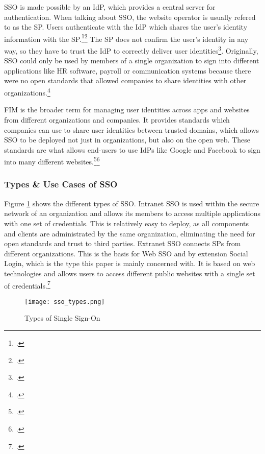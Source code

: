 \ac{SSO} is made possible by an \ac{IdP}, which provides a central server for authentication.
When talking about \ac{SSO}, the website operator is usually refered to as the \ac{SP}.
Users authenticate with the \ac{IdP} which shares the user's identity information with the \ac{SP}.\footcite[Cp.][p. 24]{Beltran2016}\footcite[Cp.][p. 25]{Bauer2013}
The \ac{SP} does not confirm the user's identity in any way, so they have to trust the \ac{IdP} to correctly
deliver user identities\footcite[Cp.][]{Nallathamby2018}.
Originally, \ac{SSO} could only be used by members of a single organization to sign into different 
applications like HR software, payroll or communication systems because there were no open standards
that allowed companies to share identities with other organizations.\footcite[Cp.][]{OktaFIM}

\ac{FIM} is the broader term for managing user identities across apps and websites from different organizations and companies.
It provides standards which companies can use to share user identities between trusted domains,
which allows \ac{SSO} to be deployed not just in organizations, but also on the open web.
These standards are what allows end-users to use \acp{IdP} like Google and Facebook to sign into many
different websites.\footcite[Cp.][]{OktaFIM}\footcite[Cp.][p. 1]{Miculan2011}

\subsubsection{Types \& Use Cases of SSO}

Figure \ref{fig:sso_types} shows the different types of \ac{SSO}.
Intranet \ac{SSO} is used within the secure network of an organization and allows its members to 
access multiple applications with one set of credentials. This is relatively easy to deploy, as all components
and clients are administrated by the same organization, eliminating the need for open standards and trust to
third parties.
Extranet \ac{SSO} connects \acp{SP} from different organizations.
This is the basis for Web \ac{SSO} and by extension Social Login, which is the type this paper is mainly concerned with.
It is based on web technologies and allows users to access different public websites with a single set of credentials.\footcite[Cp.][p. 135]{Radha2012}

\begin{figure}[H]
    \centering
    \caption{Types of Single Sign-On}
	\label{fig:sso_types}
    \texttt{[image: sso\_types.png]}
    \\
    \cite[Source:][]{Radha2012}
\end{figure}

